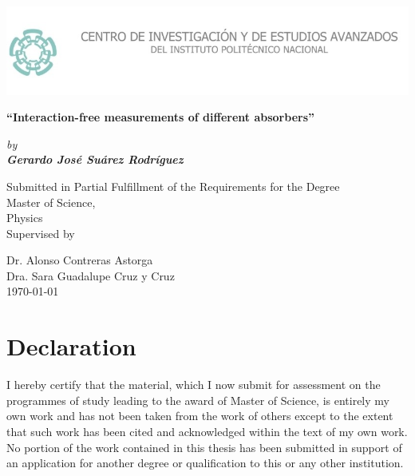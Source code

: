 \documentclass[12pt]{book}
\begin{document}
\newcommand\numberthis{\addtocounter{equation}{1}\tag{\theequation}}


\thispagestyle{empty}
\setlength\headheight{0pt} 
\begin{center}

\begin{center}
\includegraphics[width=1\linewidth]{images/logo.jpg}            
\end{center}	

  \vspace{3 cm}

        {\Large\bfseries  ``Interaction-free measurements of different absorbers''\par}
        
        \vspace{0.5cm}
        {\Large\itshape by \\ \bfseries Gerardo José Suárez Rodríguez \par \par}
        

\vspace{2cm}

Submitted in Partial Fulfillment of the Requirements for the Degree \\
Master of Science, \\ Physics\\
Supervised by\par
Dr. Alonso Contreras Astorga  \\
Dra. Sara Guadalupe Cruz y Cruz\\


\vspace{1.5cm}
\large
\today

\end{center}

\clearpage
\restoregeometry
\justify

\section*{Declaration}
I hereby certify that the material, which I now submit for assessment on the programmes of study leading to the award of Master of Science, is entirely my own work and has not been taken from the work of others except to the extent that such work has been cited and acknowledged within the text of my own work. No portion of the work contained in this thesis has been submitted in support of an application for another degree or qualification to this or any other institution.
\end{document}

